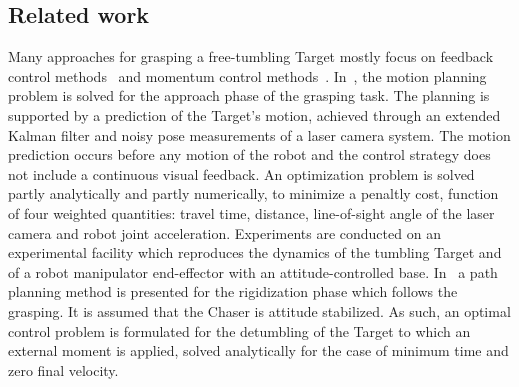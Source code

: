 \subsection{Related work}
\label{sec:related_work}
%
Many approaches for grasping a free-tumbling Target mostly focus on feedback control methods~\cite{moosavian2007free}\cite{dlr96736} and momentum control methods~\cite{yoshida2006capture}. In~\cite{aghili2012prediction}, the motion planning problem is solved for the approach phase of the grasping task. The planning is supported by a prediction of the Target's motion, achieved through an extended Kalman filter and noisy pose measurements of a laser camera system. The motion prediction occurs before any motion of the robot and the control strategy does not include a continuous visual feedback. An optimization problem is solved partly analytically and partly numerically, to minimize a penaltly cost, function of four weighted quantities: travel time, distance, line-of-sight angle of the laser camera and robot joint acceleration. %
Experiments are conducted on an experimental facility which reproduces the dynamics of the tumbling Target and of a robot manipulator end-effector with an attitude-controlled base. In~\cite{aghili2009optimal} a path planning method is presented for the rigidization phase which follows the grasping. It is assumed that the Chaser is attitude stabilized. As such, an optimal control problem is formulated for the detumbling of the Target to which an external moment is applied, solved analytically for the case of minimum time and zero final velocity.

